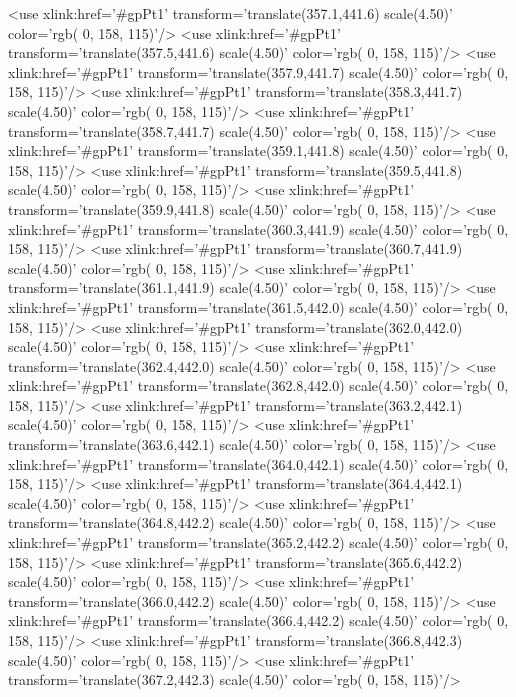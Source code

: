 	<use xlink:href='#gpPt1' transform='translate(357.1,441.6) scale(4.50)' color='rgb(  0, 158, 115)'/>
	<use xlink:href='#gpPt1' transform='translate(357.5,441.6) scale(4.50)' color='rgb(  0, 158, 115)'/>
	<use xlink:href='#gpPt1' transform='translate(357.9,441.7) scale(4.50)' color='rgb(  0, 158, 115)'/>
	<use xlink:href='#gpPt1' transform='translate(358.3,441.7) scale(4.50)' color='rgb(  0, 158, 115)'/>
	<use xlink:href='#gpPt1' transform='translate(358.7,441.7) scale(4.50)' color='rgb(  0, 158, 115)'/>
	<use xlink:href='#gpPt1' transform='translate(359.1,441.8) scale(4.50)' color='rgb(  0, 158, 115)'/>
	<use xlink:href='#gpPt1' transform='translate(359.5,441.8) scale(4.50)' color='rgb(  0, 158, 115)'/>
	<use xlink:href='#gpPt1' transform='translate(359.9,441.8) scale(4.50)' color='rgb(  0, 158, 115)'/>
	<use xlink:href='#gpPt1' transform='translate(360.3,441.9) scale(4.50)' color='rgb(  0, 158, 115)'/>
	<use xlink:href='#gpPt1' transform='translate(360.7,441.9) scale(4.50)' color='rgb(  0, 158, 115)'/>
	<use xlink:href='#gpPt1' transform='translate(361.1,441.9) scale(4.50)' color='rgb(  0, 158, 115)'/>
	<use xlink:href='#gpPt1' transform='translate(361.5,442.0) scale(4.50)' color='rgb(  0, 158, 115)'/>
	<use xlink:href='#gpPt1' transform='translate(362.0,442.0) scale(4.50)' color='rgb(  0, 158, 115)'/>
	<use xlink:href='#gpPt1' transform='translate(362.4,442.0) scale(4.50)' color='rgb(  0, 158, 115)'/>
	<use xlink:href='#gpPt1' transform='translate(362.8,442.0) scale(4.50)' color='rgb(  0, 158, 115)'/>
	<use xlink:href='#gpPt1' transform='translate(363.2,442.1) scale(4.50)' color='rgb(  0, 158, 115)'/>
	<use xlink:href='#gpPt1' transform='translate(363.6,442.1) scale(4.50)' color='rgb(  0, 158, 115)'/>
	<use xlink:href='#gpPt1' transform='translate(364.0,442.1) scale(4.50)' color='rgb(  0, 158, 115)'/>
	<use xlink:href='#gpPt1' transform='translate(364.4,442.1) scale(4.50)' color='rgb(  0, 158, 115)'/>
	<use xlink:href='#gpPt1' transform='translate(364.8,442.2) scale(4.50)' color='rgb(  0, 158, 115)'/>
	<use xlink:href='#gpPt1' transform='translate(365.2,442.2) scale(4.50)' color='rgb(  0, 158, 115)'/>
	<use xlink:href='#gpPt1' transform='translate(365.6,442.2) scale(4.50)' color='rgb(  0, 158, 115)'/>
	<use xlink:href='#gpPt1' transform='translate(366.0,442.2) scale(4.50)' color='rgb(  0, 158, 115)'/>
	<use xlink:href='#gpPt1' transform='translate(366.4,442.2) scale(4.50)' color='rgb(  0, 158, 115)'/>
	<use xlink:href='#gpPt1' transform='translate(366.8,442.3) scale(4.50)' color='rgb(  0, 158, 115)'/>
	<use xlink:href='#gpPt1' transform='translate(367.2,442.3) scale(4.50)' color='rgb(  0, 158, 115)'/>
